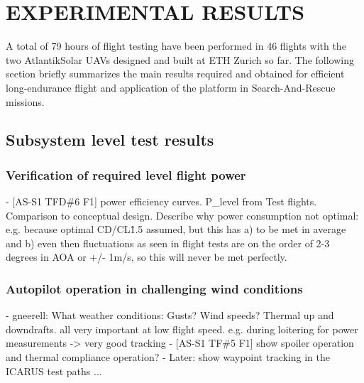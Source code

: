 \section{EXPERIMENTAL RESULTS}

A total of 79 hours of flight testing have been performed in 46 flights with the two AtlantikSolar UAVs designed and built at ETH Zurich so far. The following section briefly summarizes the main results required and obtained for efficient long-endurance flight and application of the platform in Search-And-Rescue missions.
 
\subsection{Subsystem level test results}
 
\subsubsection{Verification of required level flight power}

    - [AS-S1 TFD\#6 F1] power efficiency curves. P\_level from Test flights. Comparison to conceptual design. Describe why power consumption not optimal: e.g. because optimal CD/CL\^1.5 assumed, but this has a) to be met in average and b) even then fluctuations as seen in flight tests are on the order of 2-3 degrees in AOA or +/- 1m/s, so this will never be met perfectly.

\subsubsection{Autopilot operation in challenging wind conditions}

	- gneerell: What weather conditions: Gusts? Wind speeds? Thermal up and downdrafts. all very important at low flight speed.
	e.g. during loitering for power measurements -> very good tracking
	- [AS-S1 TF\#5 F1] show spoiler operation and thermal compliance operation?
	- Later: show waypoint tracking in the ICARUS test paths ...  

